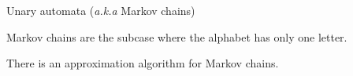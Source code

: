 \documentclass[svgnames]{beamer}
\renewcommand{\AA}{\mathcal{A}}
\newcommand{\prob}[1]{\mathbb{P}_{#1}}
\newcommand{\set}[1]{\{ #1 \}}
\begin{document}
\begin{frame}{Unary automata (\textit{a.k.a} Markov chains)}

Markov chains are the subcase where the alphabet has only one letter.

\begin{theorem}
There is an approximation algorithm for Markov chains.
\end{theorem}
%
%
%
%
%
%
%
%
%

\end{frame}
\end{document}
